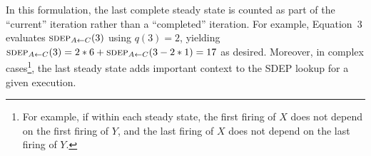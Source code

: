 In this formulation, the last complete steady state is counted as part
of the ``current'' iteration rather than a ``completed'' iteration.
For example, Equation~3 evaluates $\textsc{sdep}_{A \small{\leftarrow} C}(3)$ using $q(3)=2$,
yielding $\textsc{sdep}_{A \small{\leftarrow} C}(3) = 2*6 + \textsc{sdep}_{A \small{\leftarrow} C}(3-2*1) = 17$ as
desired.  Moreover, in complex cases\footnote{{For example, if within
each steady state, the first firing of $X$ does not depend on the
first firing of $Y$, and the last firing of $X$ does not depend on the
last firing of $Y$.}}, the last steady state adds important context to
the SDEP lookup for a given execution.









